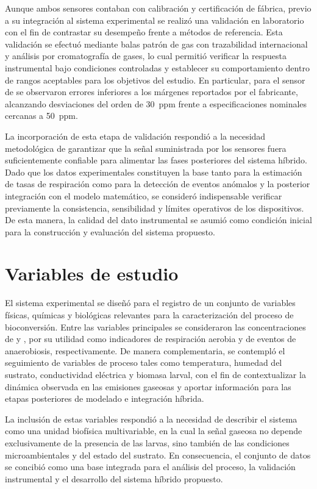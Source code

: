 Aunque ambos sensores contaban con calibración y certificación de fábrica, previo a su integración al sistema experimental se realizó una validación en laboratorio con el fin de contrastar su desempeño frente a métodos de referencia. Esta validación se efectuó mediante balas patrón de gas con trazabilidad internacional y análisis por cromatografía de gases, lo cual permitió verificar la respuesta instrumental bajo condiciones controladas y establecer su comportamiento dentro de rangos aceptables para los objetivos del estudio. En particular, para el sensor de  se observaron errores inferiores a los márgenes reportados por el fabricante, alcanzando desviaciones del orden de 30~ppm frente a especificaciones nominales cercanas a 50~ppm.

La incorporación de esta etapa de validación respondió a la necesidad metodológica de garantizar que la señal suministrada por los sensores fuera suficientemente confiable para alimentar las fases posteriores del sistema híbrido. Dado que los datos experimentales constituyen la base tanto para la estimación de tasas de respiración como para la detección de eventos anómalos y la posterior integración con el modelo matemático, se consideró indispensable verificar previamente la consistencia, sensibilidad y límites operativos de los dispositivos. De esta manera, la calidad del dato instrumental se asumió como condición inicial para la construcción y evaluación del sistema propuesto.

\section{Variables de estudio}

El sistema experimental se diseñó para el registro de un conjunto de variables físicas, químicas y biológicas relevantes para la caracterización del proceso de bioconversión. Entre las variables principales se consideraron las concentraciones de  y , por su utilidad como indicadores de respiración aerobia y de eventos de anaerobiosis, respectivamente. De manera complementaria, se contempló el seguimiento de variables de proceso tales como temperatura, humedad del sustrato, conductividad eléctrica y biomasa larval, con el fin de contextualizar la dinámica observada en las emisiones gaseosas y aportar información para las etapas posteriores de modelado e integración híbrida.

La inclusión de estas variables respondió a la necesidad de describir el sistema como una unidad biofísica multivariable, en la cual la señal gaseosa no depende exclusivamente de la presencia de las larvas, sino también de las condiciones microambientales y del estado del sustrato. En consecuencia, el conjunto de datos se concibió como una base integrada para el análisis del proceso, la validación instrumental y el desarrollo del sistema híbrido propuesto.

